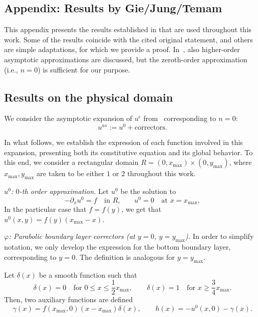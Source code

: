 \documentclass{article}
\newcommand{\ueps}{u^\epsilon}
\newcommand{\uas}{u^{as}}
\begin{document}
\begin{appendix}
\section{Appendix: Results by Gie/Jung/Temam}\label{Appendix:Temam}

This appendix presents the results established in \cite{GieEtAl:13} that are used throughout this work. Some of the results coincide with the cited original statement, and others are simple adaptations, for which we provide a proof. In~\cite{GieEtAl:13}, also higher-order asymptotic approximations are discussed, but the zeroth-order approximation (i.e., $n = 0$) is sufficient for our purpose. 

\subsection{Results on the physical domain}
We consider the asymptotic expansion of $\ueps$ from~\cite{GieEtAl:13} corresponding to $n=0$:
\begin{equation*}
\uas := u^0 + \text{correctors}.
\end{equation*}

In what follows, we establish the expression of each function involved in this expansion, presenting both its constitutive equation and its global behavior. To this end, we consider a rectangular domain $R = (0,x_{\max}) \times (0,y_{\max})$, where $x_{\max},y_{\max}$ are taken to be either $1$ or $2$ throughout this work.

\medskip 
\textit{$u^0$: $0$-th order approximation.}
Let $u^0$ be the solution to
\begin{equation*}
    -  \partial_x u^0 =f \quad\text{in $R$,}\qquad
        u^0 = 0 \quad\text{at } x=x_{\max},
\end{equation*}
In the particular case that $f = f(y)$, we get that $u^0(x,y) = f(y)(x_{\max}-x).$

\medskip 
\textit{$\varphi$: Parabolic boundary layer correctors (at $y=0$, $y=y_{\max}$).}
In order to simplify notation, we only develop the expression for the bottom boundary layer, corresponding to $y=0$. The definition is analogous for $y=y_{\max}$.

Let $\delta(x)$ be a smooth function such that
\begin{equation*}
    \delta(x) = 0 \quad \text{for } 0\le x \le \frac12 x_{\max},\qquad
    \delta(x) = 1 \quad \text{for } x \ge \frac34 x_{\max}.
\end{equation*}
Then, two auxiliary functions are defined
\begin{equation*}
    \gamma(x)=f(x_{\max},0)(x-x_{\max})\delta(x),\qquad
    h(x)=-u^0(x,0) -\gamma(x).
\end{equation*}


\end{appendix}
\end{document}
